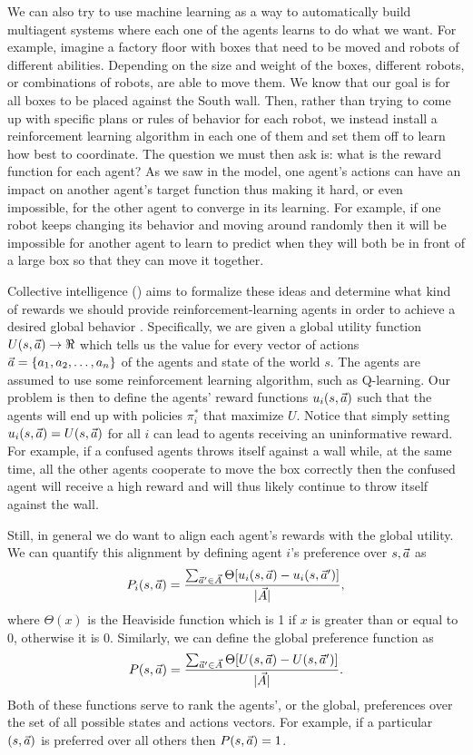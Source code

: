 We can also try to use machine learning as a way to automatically
build multiagent systems where each one of the agents learns to do
what we want. For example, imagine a factory floor with boxes that
need to be moved and robots of different abilities. Depending on the
size and weight of the boxes, different robots, or combinations of
robots, are able to move them. We know that our goal is for all boxes
to be placed against the South wall. Then, rather than trying to come
up with specific plans or rules of behavior for each robot, we instead
install a reinforcement learning algorithm in each one of them and set
them off to learn how best to coordinate. The question we must then
ask is: what is the reward function for each agent? As we saw in the
 model, one agent's actions can have an impact on another
agent's target function thus making it hard, or even impossible, for
the other agent to converge in its learning. For example, if one robot
keeps changing its behavior and moving around randomly then it will be
impossible for another agent to learn to predict when they will both
be in front of a large box so that they can move it together.

Collective intelligence () aims to formalize these ideas and
determine what kind of rewards we should provide
reinforcement-learning agents in order to achieve a desired global
behavior \cite{wolpert99a}. Specifically, we are given a global
utility function $U(s,\vec{a}) \rightarrow \Re$ which tells us the value
for every vector of actions $\vec{a} = \{a_1, a_2,\ldots, a_n\}$ of the
agents and state of the world $s$. The agents are assumed to use some
reinforcement learning algorithm, such as Q-learning. Our problem is
then to define the agents' reward functions $u_i(s, \vec{a})$ such that
the agents will end up with policies $\pi_i^*$ that maximize $U$.
Notice that simply setting $u_i(s, \vec{a}) = U(s, \vec{a})$ for all $i$ can
lead to agents receiving an uninformative reward. For example, if a
confused agents throws itself against a wall while, at the same time,
all the other agents cooperate to move the box correctly then the
confused agent will receive a high reward and will thus likely
continue to throw itself against the wall.

Still, in general we do want to align each agent's rewards with the
global utility. We can quantify this alignment by defining agent $i$'s
preference over $s,\vec{a}$ as
\begin{equation}
  \label{eq:preference}
  P_i(s,\vec{a}) = \frac{\sum_{\vec{a}' \in \vec{A}} \Theta[u_i(s,\vec{a}) - u_i(s,\vec{a}')]}{|\vec{A}|},
\end{equation}
where $\Theta(x)$ is the Heaviside function which is 1 if $x$ is
greater than or equal to 0, otherwise it is 0. Similarly, we can
define the global preference function as
\begin{equation}
  \label{eq:global-pref}
    P(s,\vec{a}) = \frac{\sum_{\vec{a}' \in \vec{A}} \Theta[U(s,\vec{a}) - U(s,\vec{a}')]}{|\vec{A}|}.
\end{equation}
Both of these functions serve to rank the agents', or the global,
preferences over the set of all possible states and actions vectors.
For example, if a particular $(s,\vec{a})$ is preferred over all others
then $P(s,\vec{a}) = 1$.  

